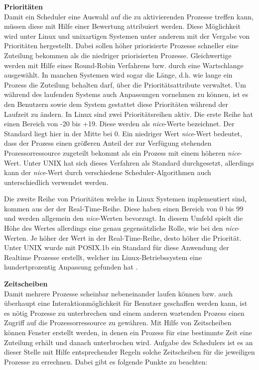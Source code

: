 \textbf{Prioritäten}\\
Damit ein Scheduler eine Auswahl auf die zu aktivierenden Prozesse treffen kann, müssen diese mit Hilfe einer Bewertung attribuiert werden. Diese Möglichkeit wird unter Linux und unixartigen Systemen unter anderem mit der Vergabe von Prioritäten hergestellt.
Dabei sollen höher priorisierte Prozesse schneller eine Zuteilung bekommen als die niedriger priorisierten Prozesse. Gleichwertige werden mit Hilfe eines Round-Robin Verfahrens bzw. durch eine Wartschlange ausgewählt. In manchen Systemen wird sogar die Länge, d.h. wie lange ein Prozess die Zuteilung behalten darf, über die Prioritätsattribute verwaltet. Um während des laufenden Systems auch Anpassungen vornehmen zu kön\-nen, ist es den Benutzern sowie dem System gestattet diese Prioritäten während der Laufzeit zu ändern.
In Linux sind zwei Prioritäts\-reihen aktiv. Die erste Reihe hat einen Bereich von -20 bis +19. Diese werden als \textit{nice}-Werte bezeichnet. Der Standard liegt hier in der Mitte bei 0. Ein niedriger Wert \textit{nice}-Wert bedeutet, dass der Prozess einen größeren Anteil der zur Verfügung stehenden Prozessorressource zugeteilt bekommt als ein Prozess mit einem höheren \textit{nice}-Wert.
Unter UNIX hat sich dieses Verfahren als Standard durchgesetzt, allerdings kann der \textit{nice}-Wert durch verschiedene Scheduler-Algorithmen auch unterschiedlich verwendet werden.

Die zweite Reihe von Prioritäten welche in Linux Systemen implementiert sind, kommen aus der der Real-Time-Reihe. Diese haben einen Bereich von 0 bis 99 und werden allgemein den \textit{nice}-Werten bevorzugt. In diesem Umfeld spielt die Höhe des Wertes allerdings eine genau gegensätzliche Rolle,  wie bei den \textit{nice}-Werten. Je höher der Wert in der Real-Time-Reihe, desto höher die Priorität. Unter UNIX wurde mit POSIX.1b ein Standard für diese Anwendung der Realtime Prozesse erstellt, welcher im Linux-Betriebssystem eine hundertprozentig Anpassung gefunden hat \cite{rlove}.

\textbf{Zeitscheiben}\\
Damit mehrere Prozesse scheinbar nebeneinander laufen können bzw. auch überhaupt eine Interaktionmöglichkeit für Benutzer geschaffen werden kann, ist es nötig Prozesse zu unterbrechen und einem anderen wartenden Prozess einen Zugriff auf die Prozessor\-ressource zu gewähren. Mit Hilfe von Zeitscheiben können Fenster erstellt werden, in denen ein Prozess für eine bestimmte Zeit eine Zuteilung erhält und danach unterbrochen wird.
Aufgabe des Schedulers ist es an dieser Stelle mit Hilfe entsprechender Regeln solche Zeitscheiben für die jeweiligen Prozesse zu errechnen. Dabei gibt es folgende Punkte zu beachten:

